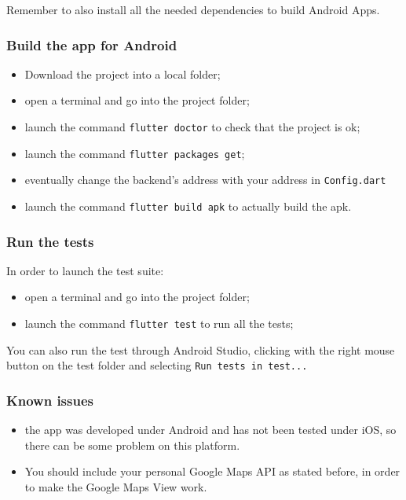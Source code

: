 Remember to also install all the needed dependencies to build Android Apps.




\subsubsection{Build the app for Android}
\begin{itemize}
    \item Download the project into a local folder;
    \item open a terminal and go into the project folder;
    \item launch the command \texttt{flutter doctor} to check that the project is ok;
    \item launch the command \texttt{flutter packages get};
    \item eventually change the backend's address with your address in \texttt{Config.dart}
    \item launch the command \texttt{flutter build apk} to actually build the apk.
\end{itemize}

\subsubsection{Run the tests}
In order to launch the test suite:
\begin{itemize}
    \item open a terminal and go into the project folder;
    \item launch the command \texttt{flutter test} to run all the tests;
\end{itemize}

You can also run the test through Android Studio, clicking with the right mouse button on the test folder and selecting \texttt{Run tests in test...}

\subsubsection{Known issues}
\begin{itemize}
    \item the app was developed under Android and has not been tested under iOS, so there can be some problem on this platform.
    \item You should include your personal Google Maps API as stated before, in order to make the Google Maps View work.
\end{itemize}





